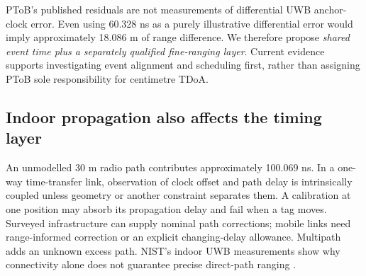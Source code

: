 \documentclass[11pt,letterpaper]{article}
\begin{document}
PToB's published residuals are not measurements of differential UWB anchor-clock error. Even using 60.328 ns as a purely illustrative differential error would imply approximately 18.086 m of range difference. We therefore propose \emph{shared event time plus a separately qualified fine-ranging layer}. Current evidence supports investigating event alignment and scheduling first, rather than assigning PToB sole responsibility for centimetre TDoA.

\subsection{Indoor propagation also affects the timing layer}
An unmodelled 30 m radio path contributes approximately 100.069 ns. In a one-way time-transfer link, observation of clock offset and path delay is intrinsically coupled unless geometry or another constraint separates them. A calibration at one position may absorb its propagation delay and fail when a tag moves. Surveyed infrastructure can supply nominal path corrections; mobile links need range-informed correction or an explicit changing-delay allowance. Multipath adds an unknown excess path. NIST's indoor UWB measurements show why connectivity alone does not guarantee precise direct-path ranging \cite{nistindoor}.
\end{document}
